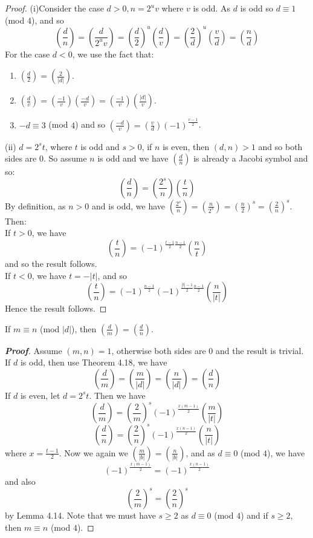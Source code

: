 \begin{proof}
(i)Consider the case $d>0, n=2^u v$ where $v$ is odd. As $d$ is odd so $d \equiv 1$ (mod $4$),
and so
$$\left(\frac{d}{n}\right)=\left(\frac{d}{2^u v}\right)
=\left(\frac{d}{2}\right)^u \left(\frac{d}{v}\right)
=\left(\frac{2}{d}\right)^u \left(\frac{v}{d}\right)=\left(\frac{n}{d}\right)$$
For the case $d<0$, we use the fact that:
\begin{enumerate}
\item $(\frac{d}{2})=(\frac{2}{|d|})$.\\
\item $(\frac{d}{v})=(\frac{-1}{v})(\frac{-d}{v})=(\frac{-1}{v})(\frac{|d|}{v})$.\\
\item $-d \equiv 3$ (mod $4$) and so $(\frac{-d}{v})=(\frac{v}{d}) (-1)^{\frac{v-1}{2}}$.
\end{enumerate}
(ii) $d=2^s t$, where $t$ is odd and $s>0$, if $n$ is even, then $(d,n)>1$ and so both sides are $0$. So assume $n$ is odd and we have $(\frac{d}{n})$ is already a Jacobi symbol and so:
$$\left(\frac{d}{n}\right)=\left(\frac{2^s}{n}\right)\left(\frac{t}{n}\right)$$
By definition, as $n>0$ and is odd, we have $(\frac{2^s}{n})=(\frac{n}{2^s})=(\frac{n}{2})^s=(\frac{2}{n})^s$. Then:\\
If $t>0$, we have
$$\left(\frac{t}{n}\right)=(-1)^{\frac{t-1}{2}\frac{n-1}{2}} \left(\frac{n}{t}\right)$$
and so the result follows.\\
If $t<0$, we have $t=-|t|$, and so
$$\left(\frac{t}{n}\right)=(-1)^{\frac{n-1}{2}}(-1)^{\frac{|t|-1}{2}\frac{n-1}{2}} \left(\frac{n}{|t|}\right)$$ Hence the result follows.
\end{proof}
\begin{theorem} If $m \equiv n$ (mod $|d|$), then $(\frac{d}{m})=(\frac{d}{n})$.
\end{theorem}
\begin{proof}[\bf Proof] Assume $(m,n)=1$, otherwise both sides are $0$ and the result is trivial.
If $d$ is odd, then use Theorem 4.18, we have
$$\left(\frac{d}{m}\right)=\left(\frac{m}{|d|}\right)=\left(\frac{n}{|d|}\right)=\left(\frac{d}{n}\right)$$
If $d$ is even, let $d=2^s t$. Then we have
$$\left(\frac{d}{m}\right)=\left(\frac{2}{m}\right)^s (-1)^{\frac{x(m-1)}{2}}\left(\frac{m}{|t|}\right)$$
$$\left(\frac{d}{n}\right)=\left(\frac{2}{n}\right)^s (-1)^{\frac{x(n-1)}{2}}\left(\frac{n}{|t|}\right)$$
where $x=\frac{t-1}{2}$. Now we again we $(\frac{m}{|b|})=(\frac{n}{|b|})$, and as $d \equiv 0$ (mod $4$), we have
$$(-1)^{\frac{x(m-1)}{2}}=(-1)^{\frac{x(n-1)}{2}}$$
and also
$$\left(\frac{2}{m}\right)^s=\left(\frac{2}{n}\right)^s$$
by Lemma 4.14. Note that we must have $s \ge 2$ as $d \equiv 0$ (mod $4$) and if $s \ge 2$, then $m \equiv n$ (mod $4$).
\end{proof}


